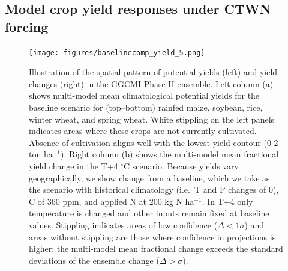 \documentclass[gmd, manuscript]{copernicus} %
\begin{document}

\subsection{Model crop yield responses under CTWN forcing}
\begin{figure}[ht]
\centering
   \texttt{[image: figures/baselinecomp\_yield\_5.png]} 
  \caption{Illustration of the spatial pattern of potential yields (left) and yield changes (right) in the GGCMI Phase II ensemble. Left column (a) shows multi-model mean climatological potential yields for the baseline scenario for (top--bottom) rainfed maize, soybean, rice, winter wheat, and spring wheat. 
   White stippling on the left panels indicates areas where these crops are not currently cultivated. 
   Absence of cultivation aligns well with the lowest yield contour (0-2 ton ha$^{-1}$). 
   Right column (b) shows the multi-model mean fractional yield change in the T+4 $^{\circ}$C scenario.
   Because yields vary geographically, we show change from a baseline, which we take as the scenario with historical climatology (i.e.\ T and P changes of 0), C of 360 ppm, and applied N at 200 kg N ha$^{-1}$. 
   In T+4 only temperature is changed and other inputs remain fixed at baseline values. 
   Stippling indicates areas of low confidence ($\Delta < 1 \sigma$) and areas without stippling are those where confidence in projections is higher: the multi-model mean fractional change exceeds the standard deviations of the ensemble change ($\Delta > \sigma$). 
   }
   \label{fig:maizesoybaseline}
\end{figure}
\end{document}
